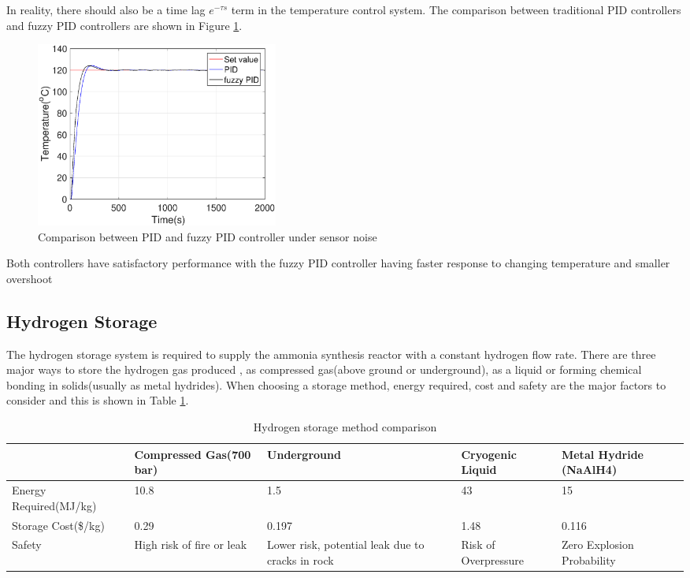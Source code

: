 In reality, there should also be a time lag $e^{-\tau s}$ term in the temperature control system. 
The comparison between traditional PID controllers and fuzzy PID controllers are shown in Figure \ref{fig:compare}.
\begin{figure}[H]
\centering
\includegraphics[width = 8cm]{pidpid.eps}
\caption{Comparison between PID and fuzzy PID controller under sensor noise}
\label{fig:compare}
\end{figure}
Both controllers have satisfactory performance with the fuzzy PID controller having faster response to changing temperature and smaller overshoot 



\subsection{Hydrogen  Storage }
The hydrogen storage system is required to supply the ammonia synthesis reactor with a constant hydrogen flow rate. There are three major ways to store the hydrogen gas produced , as compressed gas(above ground or underground), as a liquid or forming chemical bonding in solids(usually as metal hydrides).
When choosing a storage method, energy required, cost and safety are the major factors to consider and this is shown in Table \ref{tab:methods}.
\begin{singlespace}
\begin{table}[H]
\begin{tabular}{ |p{4.4cm}|p{2.4cm}|p{2.9cm}|p{3cm}| p{2.7cm}|} 
 \hline
  & Compressed Gas(700 bar) & Underground & Cryogenic Liquid   & Metal Hydride (NaAlH4) \\ 
 \hline
 Energy Required(MJ/kg) & 10.8  & 1.5  &43    & 15\\ 
 \hline
Storage Cost(\$/kg) & 0.29  & 0.197  &1.48 & 0.116\\ 
 \hline
 Safety & High risk of fire or leak & Lower risk, potential leak due to cracks in rock & Risk of Overpressure & Zero Explosion Probability \\
 \hline
\end{tabular}
\caption{\label{tab:methods}Hydrogen storage method comparison\cite{gas2}\cite{gas3}\cite{storage}\cite{storage2}}
\end{table}
\end{singlespace}

